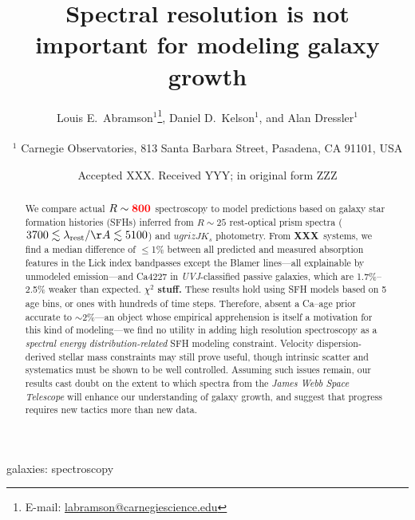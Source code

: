 \documentclass[a4paper,fleqn,usenatbib]{mnras}
\title[More is not better]{Spectral resolution is not important for modeling galaxy growth}
\author[Abramson, Kelson, \& Dressler]{Louis E.~Abramson$^{1}$\thanks{E-mail: \href{mailto:labramson@carnegiescience.edu}{labramson@carnegiescience.edu}},
Daniel D.~Kelson$^{1}$,
and Alan Dressler$^{1}$
\\
\\
$^1$	Carnegie Observatories, 813 Santa Barbara Street, Pasadena, CA 91101, USA\\
}
\date{Accepted XXX. Received YYY; in original form ZZZ}
\newcommand{\Mstel}{M_\ast}
\newcommand{\bfr}{\bf\color{red}}
\newcommand{\ntot}{{\bfr XXX}} %
\begin{document}
\label{firstpage}
\pagerange{\pageref{firstpage}--\pageref{lastpage}}
\maketitle

\begin{abstract}

	We compare actual $R\sim{\bfr 800}$ spectroscopy to model predictions based on galaxy 
	star formation histories (SFHs) inferred from $R\sim25$ rest-optical prism spectra 
	($3700\lesssim\lambda_{\rm rest}/\AA\lesssim5100$) and $ugrizJK_{s}$ photometry. 
	From \ntot\ systems, we find a median difference of $\leq$1\% between all predicted and 
	measured absorption features in the Lick index bandpasses except the Blamer lines---all 
	explainable by unmodeled emission---and Ca4227 in {\it UVJ}-classified passive galaxies, 
	which are 1.7\%--2.5\% weaker than expected. {\bfr $\chi^{2}$ stuff.}
	These results hold using SFH models based on 5 age bins, or ones with hundreds of time steps. 
	Therefore, absent a Ca--age prior accurate to $\sim$2\%---an object whose empirical apprehension 
	is itself a motivation for this kind of modeling---we find no utility in adding high 
	resolution spectroscopy as a {\it spectral energy distribution-related} SFH modeling 
	constraint. Velocity dispersion-derived stellar mass constraints may still prove useful, though
	intrinsic scatter and systematics must be shown to be well controlled. Assuming such issues
	remain, our results cast doubt on the extent to which spectra from the {\it James Webb 
	Space Telescope} will enhance our understanding of galaxy growth, and suggest that progress 
	requires new tactics more than new data.

\end{abstract}

\begin{keywords}
	galaxies: spectroscopy
\end{keywords}

\end{document}
